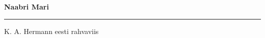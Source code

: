 \documentclass[10pt]{book}
\begin{document}
{
  \samepage
  \raggedbottom
  \raggedright
  \sloppy


  \vspace{0.2in}

  \noindent\begin{minipage}{.1\textwidth}
    \hfill\vspace{0.1in}
  \end{minipage}%
  \noindent\begin{minipage}{.8\textwidth}
    \centering
    \bfseries
    \large Naabri Mari
  \end{minipage}%
  \noindent\begin{minipage}{.1\textwidth}
      \hfill\vspace{0.1in}
  \end{minipage}

  \nopagebreak[4]
  \vspace{0.1in}
  \nopagebreak[4]
  \hrule height 0.05ex
  \nopagebreak[4]
  \vspace{-0.05in}

  {\footnotesize K. A. Hermann \hfill eesti rahvaviis }\\
  \vspace{0.01in}



}
\end{document}
